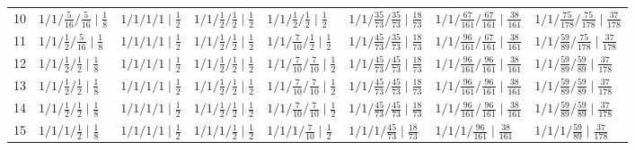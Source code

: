 \documentclass[11pt,a4paper]{article}
\theoremstyle{plain}
\theoremstyle{definition}
\theoremstyle{remark}
\begin{document}
\begin{table}[H]
{\begin{tabular}{rlllllll}
10 & $1/1/\tfrac{5}{16}/\tfrac{5}{16} \mid \tfrac{1}{8}$ & $1/1/1/1 \mid \tfrac{1}{2}$ & $1/1/\tfrac{1}{2}/\tfrac{1}{2} \mid \tfrac{1}{2}$ & $1/1/\tfrac{1}{2}/\tfrac{1}{2} \mid \tfrac{1}{2}$ & $1/1/\tfrac{35}{73}/\tfrac{35}{73} \mid \tfrac{18}{73}$ & $1/1/\tfrac{67}{161}/\tfrac{67}{161} \mid \tfrac{38}{161}$ & $1/1/\tfrac{75}{178}/\tfrac{75}{178} \mid \tfrac{37}{178}$\\
11 & $1/1/\tfrac{1}{2}/\tfrac{5}{16} \mid \tfrac{1}{8}$ & $1/1/1/1 \mid \tfrac{1}{2}$ & $1/1/\tfrac{1}{2}/\tfrac{1}{2} \mid \tfrac{1}{2}$ & $1/1/\tfrac{7}{10}/\tfrac{1}{2} \mid \tfrac{1}{2}$ & $1/1/\tfrac{45}{73}/\tfrac{35}{73} \mid \tfrac{18}{73}$ & $1/1/\tfrac{96}{161}/\tfrac{67}{161} \mid \tfrac{38}{161}$ & $1/1/\tfrac{59}{89}/\tfrac{75}{178} \mid \tfrac{37}{178}$\\
12 & $1/1/\tfrac{1}{2}/\tfrac{1}{2} \mid \tfrac{1}{8}$ & $1/1/1/1 \mid \tfrac{1}{2}$ & $1/1/\tfrac{1}{2}/\tfrac{1}{2} \mid \tfrac{1}{2}$ & $1/1/\tfrac{7}{10}/\tfrac{7}{10} \mid \tfrac{1}{2}$ & $1/1/\tfrac{45}{73}/\tfrac{45}{73} \mid \tfrac{18}{73}$ & $1/1/\tfrac{96}{161}/\tfrac{96}{161} \mid \tfrac{38}{161}$ & $1/1/\tfrac{59}{89}/\tfrac{59}{89} \mid \tfrac{37}{178}$\\
13 & $1/1/\tfrac{1}{2}/\tfrac{1}{2} \mid \tfrac{1}{8}$ & $1/1/1/1 \mid \tfrac{1}{2}$ & $1/1/\tfrac{1}{2}/\tfrac{1}{2} \mid \tfrac{1}{2}$ & $1/1/\tfrac{7}{10}/\tfrac{7}{10} \mid \tfrac{1}{2}$ & $1/1/\tfrac{45}{73}/\tfrac{45}{73} \mid \tfrac{18}{73}$ & $1/1/\tfrac{96}{161}/\tfrac{96}{161} \mid \tfrac{38}{161}$ & $1/1/\tfrac{59}{89}/\tfrac{59}{89} \mid \tfrac{37}{178}$\\
14 & $1/1/\tfrac{1}{2}/\tfrac{1}{2} \mid \tfrac{1}{8}$ & $1/1/1/1 \mid \tfrac{1}{2}$ & $1/1/\tfrac{1}{2}/\tfrac{1}{2} \mid \tfrac{1}{2}$ & $1/1/\tfrac{7}{10}/\tfrac{7}{10} \mid \tfrac{1}{2}$ & $1/1/\tfrac{45}{73}/\tfrac{45}{73} \mid \tfrac{18}{73}$ & $1/1/\tfrac{96}{161}/\tfrac{96}{161} \mid \tfrac{38}{161}$ & $1/1/\tfrac{59}{89}/\tfrac{59}{89} \mid \tfrac{37}{178}$\\
15 & $1/1/1/\tfrac{1}{2} \mid \tfrac{1}{8}$ & $1/1/1/1 \mid \tfrac{1}{2}$ & $1/1/1/\tfrac{1}{2} \mid \tfrac{1}{2}$ & $1/1/1/\tfrac{7}{10} \mid \tfrac{1}{2}$ & $1/1/1/\tfrac{45}{73} \mid \tfrac{18}{73}$ & $1/1/1/\tfrac{96}{161} \mid \tfrac{38}{161}$ & $1/1/1/\tfrac{59}{89} \mid \tfrac{37}{178}$\\
\bottomrule
\end{tabular}}
\end{table}
\end{document}

